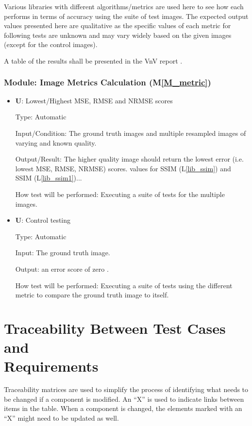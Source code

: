 \documentclass[12pt, titlepage]{article}
\newcommand{\mref}[1]{M\ref{#1}}
\newcounter{testnum} %
\newcounter{unittestnum} %
\newcommand{\lref}[1]{L\ref{#1}}
\newcommand{\lrefp}[1]{(\lref{#1})}
\begin{document}
Various libraries with different algorithms/metrics are used here to see how each
performs in terms of accuracy using the suite of test images.
The expected output values presented here are qualitative as the specific values
of each metric for following tests are unknown and may vary widely
based on the given images (except for the control images).

A table of the results shall be presented in the VnV report \cite{VnV_report}.

\subsubsection{Module: Image Metrics Calculation (\mref{M_metric})}

\begin{itemize}

\item{\textbf{U\theunittestnum \label{U_metric7}}: Lowest/Highest MSE, RMSE and NRMSE scores}

Type: Automatic

Input/Condition: The ground truth images 
  and multiple resampled images of varying and known quality.

Output/Result: The higher quality image should return the lowest error (i.e. lowest MSE, RMSE, NRMSE) scores.
values for SSIM \lrefp{lib_ssim} and SSIM \lrefp{lib_ssim1}...

How test will be performed: Executing a suite of tests 
  for the multiple images.

\item{\textbf{U\theunittestnum \label{U_metric8}}: Control testing}

Type: Automatic

Input: The ground truth image.

Output: an error score of zero .

How test will be performed: Executing a suite of tests using the different metric to compare the 
ground truth image to itself.

\end{itemize}


\newpage
\clearpage

\section{Traceability Between Test Cases and \\ Requirements}
Traceability matrices are used to simplify the process of identifying what needs to be changed 
if a component is modified. An ``X'' is used to indicate links between items in the table. 
When a component is changed, the elements marked with an ``X'' might need to be updated as well.
\end{document}
